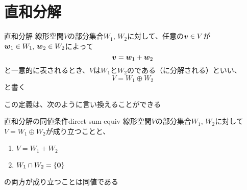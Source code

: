 \documentclass[../../../topic_linear-algebra]{subfiles}
\begin{document}
\sectionline
\section{直和分解}

\begin{definition}{直和分解}\label{def:direct-sum}
  線形空間$V$の部分集合$W_1,\,W_2$に対して、任意の$\vb*{v} \in V$が$\vb*{w}_1 \in W_1, \, \vb*{w}_2 \in W_2$によって
  \begin{equation*}
    \vb*{v} = \vb*{w}_1 + \vb*{w}_2
  \end{equation*}
  と一意的に表されるとき、$V$は$W_1$と$W_2$のである（に分解される）といい、
  \begin{equation*}
    V = W_1 \oplus W_2
  \end{equation*}
  と書く
\end{definition}

この定義は、次のように言い換えることができる

\begin{theorem}{直和分解の同値条件}{direct-sum-equiv}
  線形空間$V$の部分集合$W_1,\,W_2$に対して$V=W_1 \oplus W_2$が成り立つことと、
  \begin{enumerate}[label=\romanlabel]
    \item $V = W_1 + W_2$
    \item $W_1 \cap W_2 = \{ \vb*{0} \}$
  \end{enumerate}
  の両方が成り立つことは同値である
\end{theorem}
\end{document}
